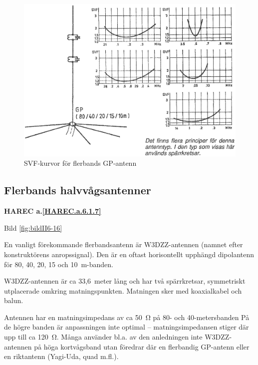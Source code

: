 \begin{figure}
  \includegraphics[width=\textwidth]{images/bild_2_6-15.png}
  \caption{SVF-kurvor för flerbands GP-antenn}
  \label{fig:bildII6-15}
\end{figure}

\subsection{Flerbands halvvågsantenner}
\textbf{
HAREC a.\ref{HAREC.a.6.1.7}\label{myHAREC.a.6.1.7}
}

Bild \ref{fig:bildII6-16}
\label{W3DZZ}

En vanligt förekommande flerbandsantenn är W3DZZ-antennen (namnet
efter konstruktörens anropssignal). Den är en oftast horisontellt
upphängd dipolantenn för 80, 40, 20, 15 och 10~m-banden.

W3DZZ-antennen är ca 33,6~meter lång och har två spärrkretsar,
symmetriskt utplacerade omkring matningspunkten. Matningen sker med
koaxialkabel och balun.

Antennen har en matningsimpedans av ca 50~Ω på 80- och
40-metersbanden På de högre banden är anpassningen inte optimal --
matningsimpedansen stiger där upp till ca 120~Ω. Många använder
bl.a. av den anledningen inte W3DZZ-antennen på höga kortvågsband utan
föredrar där en flerbandig GP-antenn eller en riktantenn (Yagi-Uda, quad
m.fl.).

